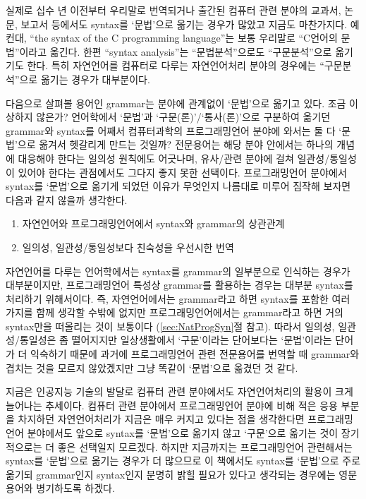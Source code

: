 실제로 십수 년 이전부터 우리말로 번역되거나 출간된 컴퓨터 관련 분야의
교과서, 논문, 보고서 등에서도 syntax를 `문법'으로 옮기는 경우가 많았고
지금도 마찬가지다. 예컨대, ``the syntax of the C programming language''는
보통 우리말로 ``C언어의 문법''이라고 옮긴다. 한편 ``syntax analysis''는
``문법분석''으로도 ``구문분석''으로 옮기기도 한다. 특히 자연언어를 컴퓨터로
다루는 자연언어처리 분야의 경우에는 ``구문분석''으로 옮기는 경우가 대부분이다.

다음으로 살펴볼 용어인 grammar는 분야에 관계없이 `문법'으로 옮기고 있다.
조금 이상하지 않은가? 언어학에서 `문법'과 `구문(론)'/`통사(론)'으로 구분하여
옮기던 grammar와 syntax를 어째서 컴퓨터과학의 프로그래밍언어 분야에 와서는
둘 다 `문법'으로 옮겨서 헷갈리게 만드는 것일까? 전문용어는 해당 분야 안에서는
하나의 개념에 대응해야 한다는 일의성 원칙에도 어긋나며, 유사/관련 분야에 걸쳐
일관성/통일성이 있어야 한다는 관점에서도 그다지 좋지 못한 선택이다.
프로그래밍언어 분야에서 syntax를 `문법'으로 옮기게 되었던 이유가 무엇인지
나름대로 미루어 짐작해 보자면 다음과 같지 않을까 생각한다.
\begin{enumerate}\tightlist
    \item 자연언어와 프로그래밍언어에서 syntax와 grammar의 상관관계
    \item 일의성, 일관성/통일성보다 친숙성을 우선시한 번역
\end{enumerate}

%
%
%
자연언어를 다루는 언어학에서는 syntax를 grammar의 일부분으로 인식하는 경우가
대부분이지만, 프로그래밍언어 특성상 grammar를 활용하는 경우는 대부분
syntax를 처리하기 위해서이다. 즉, 자연언어에서는 grammar라고 하면 syntax를
포함한 여러 가지를 함께 생각할 수밖에 없지만 프로그래밍언어에서는 grammar라고
하면 거의 syntax만을 떠올리는 것이 보통이다 (\ref{sec:NatProgSyn}절 참고).
따라서 일의성, 일관성/통일성은 좀 떨어지지만 일상생활에서 `구문'이라는
단어보다는 `문법'이라는 단어가 더 익숙하기 때문에 과거에 프로그래밍언어 관련
전문용어를 번역할 때 grammar와 겹치는 것을 모르지 않았겠지만 그냥 똑같이
`문법'으로 옮겼던 것 같다.

지금은 인공지능 기술의 발달로 컴퓨터 관련 분야에서도 자연언어처리의 활용이
크게 늘어나는 추세이다. 컴퓨터 관련 분야에서 프로그래밍언어 분야에 비해
적은 응용 부분을 차지하던 자연언어처리가 지금은 매우 커지고 있다는 점을
생각한다면 프로그래밍언어 분야에서도 앞으로 syntax를 `문법'으로 옮기지 않고
`구문'으로 옮기는 것이 장기적으로는 더 좋은 선택일지 모르겠다. 하지만
지금까지는 프로그래밍언어 관련해서는 syntax를 `문법'으로 옮기는 경우가 더
많으므로 이 책에서도 syntax를 `문법'으로 주로 옮기되 grammar인지 syntax인지
분명히 밝힐 필요가 있다고 생각되는 경우에는 영문 용어와 병기하도록 하겠다.

